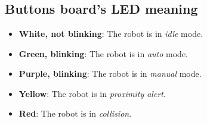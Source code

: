 \chapter{}

\section{Buttons board's LED meaning} %
\label{sec:buttons_board_s_led_meaning}

\begin{itemize}
	\item \textbf{White, not blinking}: The robot is in \emph{idle} mode.
	\item \textbf{Green, blinking}: The robot is in \emph{auto} mode.
	\item \textbf{Purple, blinking}: The robot is in \emph{manual} mode.
	\item \textbf{Yellow}: The robot is in \emph{proximity alert}.
	\item \textbf{Red}: The robot is in \emph{collision}.
\end{itemize}

